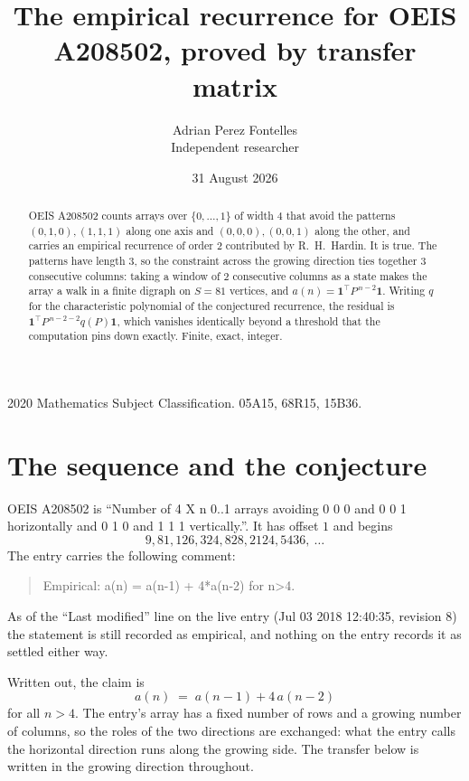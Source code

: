 \documentclass[11pt,a4paper]{article}
\title{The empirical recurrence for OEIS A208502, proved by transfer matrix}
\author{Adrian Perez Fontelles\\ \small Independent researcher}
\date{31 August 2026}
\theoremstyle{plain}
\theoremstyle{definition}
\begin{document}
\maketitle

\begin{abstract}
OEIS A208502 counts arrays over $\{0,\dots,1\}$ of width $4$ that avoid the patterns
$(0,1,0), (1,1,1)$ along one axis and $(0,0,0), (0,0,1)$ along the other, and carries an empirical recurrence of
order $2$ contributed by R.~H.~Hardin. It is true. The patterns have length $3$, so
the constraint across the growing direction ties together $3$ consecutive columns: taking a
window of $2$ consecutive columns as a state makes the array a walk in a finite digraph
on $S=81$ vertices, and $a(n)=\mathbf{1}^{\!\top}P^{\,n-2}\mathbf{1}$. Writing $q$
for the characteristic polynomial of the conjectured recurrence, the residual is
$\mathbf{1}^{\!\top}P^{\,n-2-2}q(P)\mathbf{1}$, which vanishes identically
beyond a threshold that the computation pins down exactly. Finite, exact, integer.
\end{abstract}

\noindent\small 2020 Mathematics Subject Classification. 05A15, 68R15, 15B36.\normalsize

\section{The sequence and the conjecture}

OEIS A208502 is ``Number of 4 X n 0..1 arrays avoiding 0 0 0 and 0 0 1 horizontally and 0 1 0 and 1 1 1 vertically.''. It has offset
$1$ and begins
\[
9, 81, 126, 324, 828, 2124, 5436,\ \dots
\]
The entry carries the following comment:
\begin{quote}\small
Empirical: a(n) = a(n-1) + 4*a(n-2) for n>4.
\end{quote}
As of the ``Last modified'' line on the live entry (Jul 03 2018 12:40:35, revision
8) the statement is still recorded as empirical, and nothing on the entry
records it as settled either way.

Written out, the claim is
\begin{equation}\label{eq:conj}
a(n)\;=\;a(n-1) + 4\,a(n-2)
\end{equation}
for all $n>4$. The entry's array has a fixed number of rows and a growing number of
columns, so the roles of the two directions are exchanged: what the entry calls the
horizontal direction runs along the growing side. The transfer below is written in the
growing direction throughout.
\end{document}
